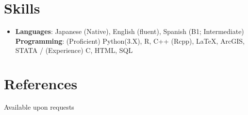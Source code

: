 \documentclass[letterpaper,11pt]{article} %
\begin{document}
\begin{comment}
This section is compressed from the various skills sections that Euro CV
recommends.
\end{comment}

\section{Skills}
 \begin{itemize}[leftmargin=0.5cm, label={}]
    \item{
     \textbf{Languages}{: Japanese (Native), English (fluent), Spanish (B1; Intermediate)} \\
     \textbf{Programming}{: (Proficient) Python(3.X), R, C++ (Rcpp), \LaTeX, ArcGIS, STATA / (Experience) C, HTML, SQL}
    }
 \end{itemize}

\section{References}
Available upon requests

\end{document}
